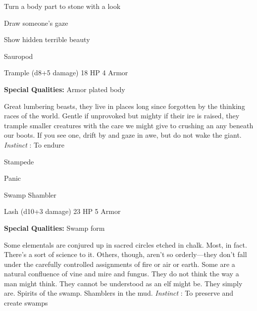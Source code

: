 \startitemize[1,packed]

\item Turn a body part to stone with a look

 
\item Draw someone's gaze

 
\item Show hidden terrible beauty


\stopitemize
 
\startMonsterName
Sauropod	 
\stopMonsterName
 

Trample (d8+5 damage)	18 HP	4 Armor

 


 
\startMonsterQualities
{\bf Special Qualities:}  Armor plated body
\stopMonsterQualities
 
\startMonsterDescription
Great lumbering beasts, they live in places long since forgotten by the thinking races of the world. Gentle if unprovoked but mighty if their ire is raised, they trample smaller creatures with the care we might give to crushing an any beneath our boots. If you see one, drift by and gaze in awe, but do not wake the giant. {\em Instinct} : To endure
\stopMonsterDescription
 
\startitemize[1,packed]

\item Stampede

 
\item Panic


\stopitemize
 
\startMonsterName
Swamp Shambler	 
\stopMonsterName
 

Lash (d10+3 damage)	23 HP	5 Armor

 


 
\startMonsterQualities
{\bf Special Qualities:}  Swamp form
\stopMonsterQualities
 
\startMonsterDescription
Some elementals are conjured up in sacred circles etched in chalk. Most, in fact. There’s a sort of science to it. Others, though, aren’t so orderly—they don’t fall under the carefully controlled assignments of fire or air or earth. Some are a natural confluence of vine and mire and fungus. They do not think the way a man might think. They cannot be understood as an elf might be. They simply are. Spirits of the swamp. Shamblers in the mud. {\em Instinct} : To preserve and create swamps
\stopMonsterDescription
 
